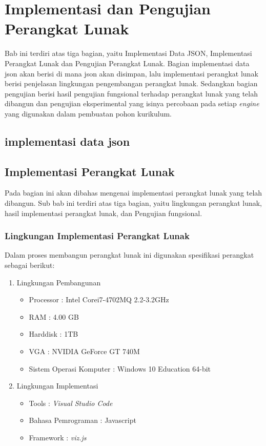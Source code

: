 \chapter{Implementasi dan Pengujian Perangkat Lunak}
\label{chap: Implementasi dan Pengujian Perangkat Lunak}

Bab ini terdiri atas tiga bagian, yaitu Implementasi Data JSON, Implementasi Perangkat Lunak dan Pengujian Perangkat Lunak. Bagian implementasi data json akan berisi di mana json akan disimpan, lalu implementasi perangkat lunak berisi penjelasan lingkungan pengembangan perangkat lunak. Sedangkan bagian pengujian berisi hasil pengujian fungsional terhadap perangkat lunak yang telah dibangun dan pengujian eksperimental yang isinya percobaan pada setiap \textit{engine} yang digunakan dalam pembuatan pohon kurikulum.

\section{implementasi data json}
\label{sec: implementasi data json}


\section{Implementasi Perangkat Lunak}
\label{sec: Implementasi Perangkat Lunak}

Pada bagian ini akan dibahas mengenai implementasi perangkat lunak yang telah dibangun. Sub bab ini terdiri atas tiga bagian, yaitu lingkungan perangkat lunak, hasil implementasi perangkat lunak, dan Pengujian fungsional.

\subsection{Lingkungan Implementasi Perangkat Lunak}
\label{sec: Lingkungan Implementasi Perangkat Lunak}

Dalam proses membangun perangkat lunak ini digunakan spesifikasi perangkat sebagai berikut:

\begin{enumerate}
\item Lingkungan Pembangunan \\
\begin{itemize}
\item Processor : Intel Corei7-4702MQ 2.2-3.2GHz
\item RAM : 4.00 GB
\item Harddisk : 1TB
\item VGA : NVIDIA GeForce GT 740M
\item Sistem Operasi Komputer : Windows 10 Education 64-bit
\end{itemize}

\item Lingkungan Implementasi
\begin{itemize}
\item Tools : \textit{Visual Studio Code}
\item Bahasa Pemrograman : Javascript
\item Framework : \textit{viz.js}
\end{itemize}

\end{enumerate}

